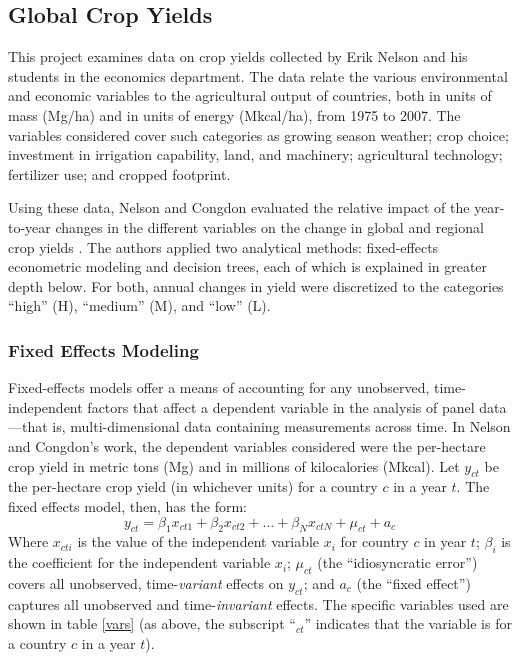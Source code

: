 \documentclass[11pt]{article}
\begin{document}
\subsection{Global Crop Yields}
This project examines data on crop yields collected by Erik Nelson and his students in the economics department. The data relate the various environmental and economic variables to the agricultural output of countries, both in units of mass (Mg/ha) and in units of energy (Mkcal/ha), from 1975 to 2007. The variables considered cover such categories as growing season weather; crop choice; investment in irrigation capability, land, and machinery; agricultural technology; fertilizer use; and cropped footprint. 

Using these data, Nelson and Congdon evaluated the relative impact of the year-to-year changes in the different variables on the change in global and regional crop yields \cite{nelson_measuring_2016}. The authors applied two analytical methods: fixed-effects econometric modeling and decision trees, each of which is explained in greater depth below. For both, annual changes in yield were discretized to the categories ``high'' (H), ``medium'' (M), and ``low'' (L). 


\subsubsection{Fixed Effects Modeling}

Fixed-effects models offer a means of accounting for any unobserved, time-independent factors that affect a dependent variable in the analysis of panel data---that is, multi-dimensional data containing measurements across time. In Nelson and Congdon's work, the dependent variables considered were the per-hectare crop yield in metric tons (Mg) and in millions of kilocalories (Mkcal). Let $y_{ct}$ be the per-hectare crop yield (in whichever units) for a country $c$ in a year $t$. The fixed effects model, then, has the form:
$$y_{ct} = \beta_1x_{ct1} + \beta_2x_{ct2} + \ldots + \beta_Nx_{ctN} + \mu_{ct} + a_c$$
Where $x_{cti}$ is the value of the independent variable $x_i$ for country $c$ in year $t$; $\beta_i$ is the coefficient for the independent variable $x_i$; $\mu_{ct}$ (the ``idiosyncratic error'') covers all unobserved, time-\emph{variant} effects  on $y_{ct}$; and $a_c$ (the ``fixed effect'') captures all unobserved and time-\emph{invariant} effects.
The specific variables used are shown in table \ref{vars} (as above, the subscript ``$_{ct}$'' indicates that the variable is for a country $c$ in a year $t$).
\end{document}
